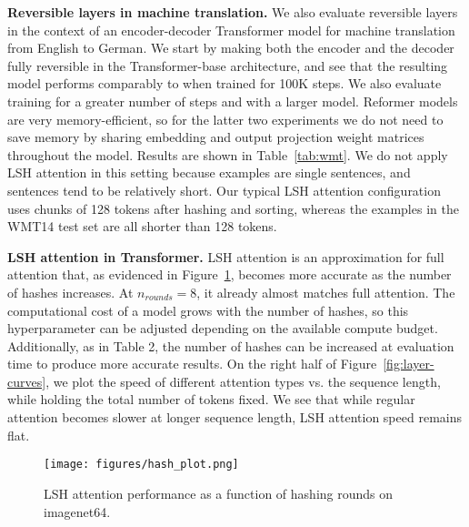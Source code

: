\documentclass{article} \usepackage{iclr2020_conference,times}
\renewcommand{\paragraph}[1]{\textbf{#1}}
\begin{document}
\paragraph{Reversible layers in machine translation.}
We also evaluate reversible layers in the context of an encoder-decoder Transformer model for machine translation from English to German. We start by making both the encoder and the decoder fully reversible in the Transformer-base architecture, and see that the resulting model performs comparably to \citet{transformer} when trained for 100K steps. We also evaluate training for a greater number of steps and with a larger model. Reformer models are very memory-efficient, so for the latter two experiments we do not need to save memory by sharing embedding and output projection weight matrices throughout the model. Results are shown in Table~\ref{tab:wmt}. We do not apply LSH attention in this setting because examples are single sentences, and sentences tend to be relatively short. Our typical LSH attention configuration uses chunks of 128 tokens after hashing and sorting, whereas the examples in the WMT14 test set are all shorter than 128 tokens.

\paragraph{LSH attention in Transformer.} \label{sec:exp_lsh}
LSH attention is an approximation for full attention that, as evidenced in Figure~\ref{fig:hash-curves}, becomes more accurate as the number of hashes increases. At $n_{rounds}=8$, it already almost matches full attention. The computational cost of a model grows with the number of hashes, so this hyperparameter can be adjusted depending on the available compute budget. Additionally, as in Table 2, the number of hashes can be increased at evaluation time to produce more accurate results.
On the right half of Figure~\ref{fig:layer-curves}, we plot the speed of different attention types vs. the sequence length, while holding the total number of tokens fixed. We see that while regular attention becomes slower at longer sequence length, LSH attention speed remains flat.


\begin{figure}[!t]
    \centering
    \texttt{[image: figures/hash\_plot.png]}
    \caption{LSH attention performance as a function of hashing rounds on imagenet64.}
    \label{fig:hash-curves}
\end{figure}
\end{document}
